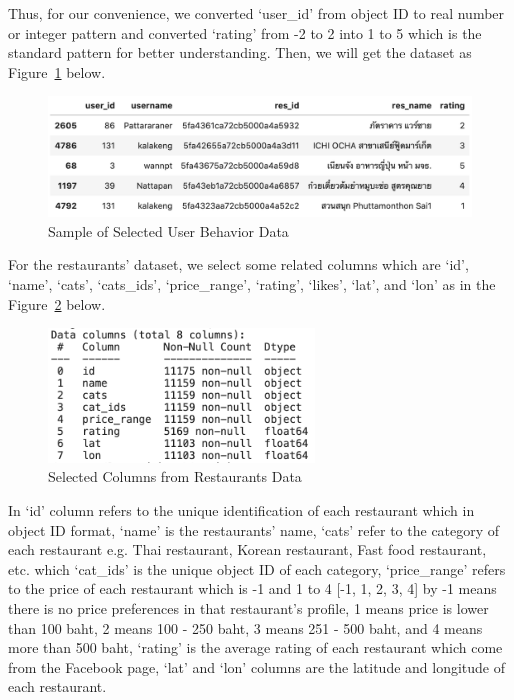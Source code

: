 \documentclass[12pt,oneside,openright,a4paper]{cpe-english-project}
\begin{document}
Thus, for our convenience, we converted ‘user\_id’ from object ID to real number or integer pattern and converted ‘rating’ from -2 to 2 into 1 to 5 which is the standard pattern for better understanding. Then, we will get the dataset as Figure~\ref{fig:4SampleofSelectedUserBehaviorData} below.

\begin{figure}[H]\centering
\includegraphics[width=350pt]{./images/4SampleofSelectedUserBehaviorData.png}
\caption{Sample of Selected User Behavior Data}\label{fig:4SampleofSelectedUserBehaviorData}
\end{figure}\vspace{-24pt}

For the restaurants’ dataset, we select some related columns which are ‘id’, ‘name’, ‘cats’, ‘cats\_ids’, ‘price\_range’, ‘rating’, ‘likes’, ‘lat’, and ‘lon’ as in the Figure~\ref{fig:4SelectedColumnsfromRestaurantsData}  below.

\begin{figure}[H]\centering
\includegraphics[width=200pt]{./images/4SelectedColumnsfromRestaurantsData.png}
\caption{Selected Columns from Restaurants Data}\label{fig:4SelectedColumnsfromRestaurantsData}
\end{figure}\vspace{-24pt}

In ‘id’ column refers to the unique identification of each restaurant which in object ID format, ‘name’ is the restaurants’ name, ‘cats’ refer to the category of each restaurant e.g. Thai restaurant, Korean restaurant, Fast food restaurant, etc. which ‘cat\_ids’ is the unique object ID of each category, ‘price\_range’ refers to the price of each restaurant which is -1 and 1 to 4 [-1, 1, 2, 3, 4] by -1 means there is no price preferences in that restaurant’s profile, 1 means price is lower than 100 baht, 2 means 100 - 250 baht, 3 means 251 - 500 baht, and 4 means more than 500 baht, ‘rating’ is the average rating of each restaurant which come from the Facebook page, ‘lat’ and ‘lon’ columns are the latitude and longitude of each restaurant.
\end{document}
